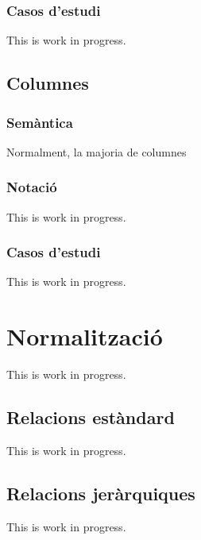 \documentclass{article}
\theoremstyle{definition}
\begin{document}
\subsubsection{Casos d'estudi}\label{section:nomenclature:tables:examples}
This is work in progress.

\subsection{Columnes}\label{section:nomenclature:columns}
\subsubsection{Semàntica}\label{section:nomenclature:columns:semantics}
Normalment, la majoria de columnes 

\subsubsection{Notació}\label{section:nomenclature:columns:notation}
This is work in progress.

\subsubsection{Casos d'estudi}\label{section:nomenclature:columns:examples}
This is work in progress.

\section{Normalització}\label{section:normalization}
This is work in progress.
\subsection{Relacions estàndard}\label{section:normalization:standard}
This is work in progress.


\subsection{Relacions jeràrquiques}\label{sectino:normalization:hierarchical}
This is work in progress.
\end{document}
